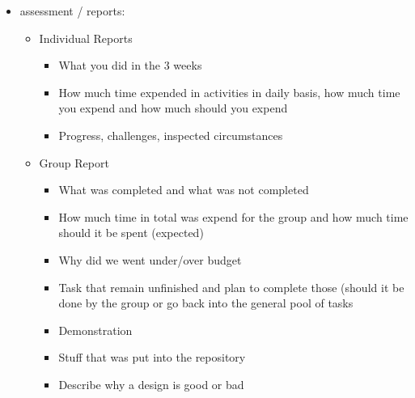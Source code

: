 \documentclass{letter}
\begin{document}
\begin{itemize}
 \item assessment / reports:
    \begin{itemize}
    \item Individual Reports
        \begin{itemize}
         \item What you did in the 3 weeks
         \item How much time expended in activities in daily basis, how much time you expend and how much should you expend
         \item Progress, challenges, inspected circumstances
        \end{itemize}

    \item Group Report
        \begin{itemize}
         \item What was completed and what was not completed
         \item How much time in total was expend for the group and how much time should it be spent (expected)
         \item Why did we went under/over budget
         \item Task that remain unfinished and plan to complete those (should it be done by the group or go back into the general pool of tasks
         \item Demonstration
         \item Stuff that was put into the repository
         \item Describe why a design is good or bad
        \end{itemize}
    \end{itemize}

 \end{itemize}
\end{document}
